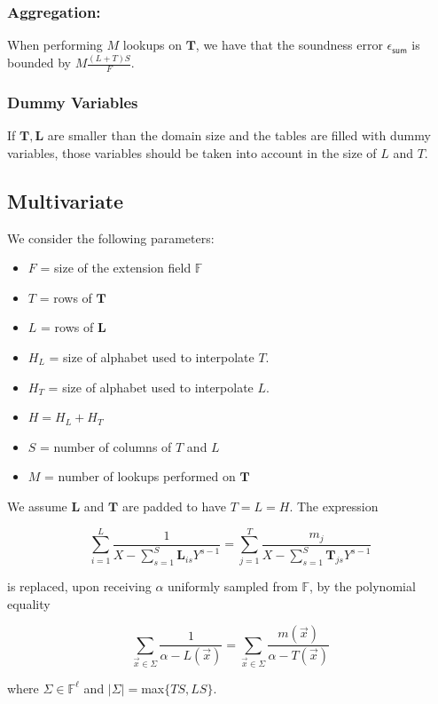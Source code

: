 \subsubsection{Aggregation:}

When performing $M$ lookups on $\mathbf T$, we have that the soundness error $\epsilon_{\mathsf{sum}}$ is bounded by $ M\frac{(L+T)S}{F}$.

\subsubsection{Dummy Variables}

If $\mathbf T, \mathbf L$ are smaller than the domain size and the tables are filled with dummy variables, those variables should be taken into account in the size of $L$ and $T$. 

\subsection{Multivariate}

We consider the following parameters:
\begin{itemize}
	\item $F$ = size of the extension field $\mathbb{F}$
	\item $T$ = rows of $\mathbf{T}$
	\item $L$ = rows of $\mathbf{L}$
	\item $H_L$ = size of alphabet used to interpolate $T$.
	\item $H_T$ = size of alphabet used to interpolate $L$.
	\item $H=H_L+H_T$
	\item $S$ = number of columns of $T$ and $L$
	\item $M$ = number of lookups performed on $\mathbf{T}$
\end{itemize}

We assume $\mathbf L$ and $\mathbf T$ are padded to have $T=L=H$.
The expression 

$$\sum_{i=1}^L \frac{1}{X- \sum_{s=1}^S \mathbf L_{is}Y^{s-1}}=\sum_{j=1}^T \frac{m_j}{X-\sum_{s=1}^S \mathbf T_{js}Y^{s-1}}$$

is replaced, upon receiving $\alpha$ uniformly sampled from $\mathbb{F}$, by the polynomial equality  

$$\sum_{\vec x\in \Sigma} \frac{1}{\alpha- L(\vec x)}=\sum_{\vec x\in \Sigma} \frac{m(\vec x)}{\alpha-T(\vec x)}$$

where $\Sigma\in\mathbb{F}^\ell$ and $|\Sigma|=$max$\{TS, LS\}$.

